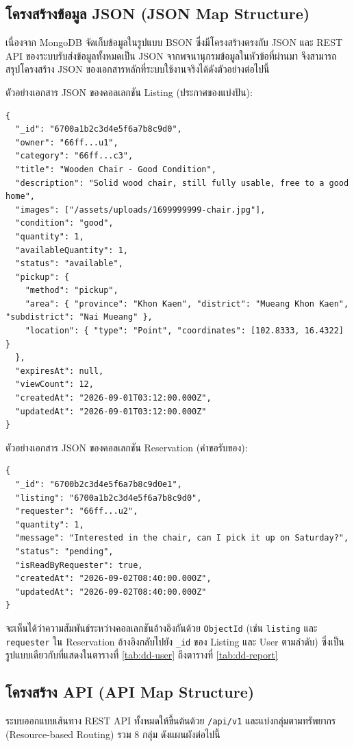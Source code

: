 \documentclass[12pt,a4paper]{report}
\begin{document}
\subsection{โครงสร้างข้อมูล JSON (JSON Map Structure)}

เนื่องจาก MongoDB จัดเก็บข้อมูลในรูปแบบ BSON ซึ่งมีโครงสร้างตรงกับ JSON และ REST API ของระบบรับส่งข้อมูลทั้งหมดเป็น JSON จากพจนานุกรมข้อมูลในหัวข้อที่ผ่านมา จึงสามารถสรุปโครงสร้าง JSON ของเอกสารหลักที่ระบบใช้งานจริงได้ดังตัวอย่างต่อไปนี้

ตัวอย่างเอกสาร JSON ของคอลเลกชัน Listing (ประกาศของแบ่งปัน):
\begin{lstlisting}
{
  "_id": "6700a1b2c3d4e5f6a7b8c9d0",
  "owner": "66ff...u1",
  "category": "66ff...c3",
  "title": "Wooden Chair - Good Condition",
  "description": "Solid wood chair, still fully usable, free to a good home",
  "images": ["/assets/uploads/1699999999-chair.jpg"],
  "condition": "good",
  "quantity": 1,
  "availableQuantity": 1,
  "status": "available",
  "pickup": {
    "method": "pickup",
    "area": { "province": "Khon Kaen", "district": "Mueang Khon Kaen", "subdistrict": "Nai Mueang" },
    "location": { "type": "Point", "coordinates": [102.8333, 16.4322] }
  },
  "expiresAt": null,
  "viewCount": 12,
  "createdAt": "2026-09-01T03:12:00.000Z",
  "updatedAt": "2026-09-01T03:12:00.000Z"
}
\end{lstlisting}

ตัวอย่างเอกสาร JSON ของคอลเลกชัน Reservation (คำขอรับของ):
\begin{lstlisting}
{
  "_id": "6700b2c3d4e5f6a7b8c9d0e1",
  "listing": "6700a1b2c3d4e5f6a7b8c9d0",
  "requester": "66ff...u2",
  "quantity": 1,
  "message": "Interested in the chair, can I pick it up on Saturday?",
  "status": "pending",
  "isReadByRequester": true,
  "createdAt": "2026-09-02T08:40:00.000Z",
  "updatedAt": "2026-09-02T08:40:00.000Z"
}
\end{lstlisting}

จะเห็นได้ว่าความสัมพันธ์ระหว่างคอลเลกชันอ้างอิงกันด้วย \texttt{ObjectId} (เช่น \texttt{listing} และ \texttt{requester} ใน Reservation อ้างอิงกลับไปยัง \texttt{\_id} ของ Listing และ User ตามลำดับ) ซึ่งเป็นรูปแบบเดียวกับที่แสดงในตารางที่ \ref{tab:dd-user} ถึงตารางที่ \ref{tab:dd-report}

\subsection{โครงสร้าง API (API Map Structure)}

ระบบออกแบบเส้นทาง REST API ทั้งหมดให้ขึ้นต้นด้วย \texttt{/api/v1} และแบ่งกลุ่มตามทรัพยากร (Resource-based Routing) รวม 8 กลุ่ม ดังแผนผังต่อไปนี้
\end{document}
